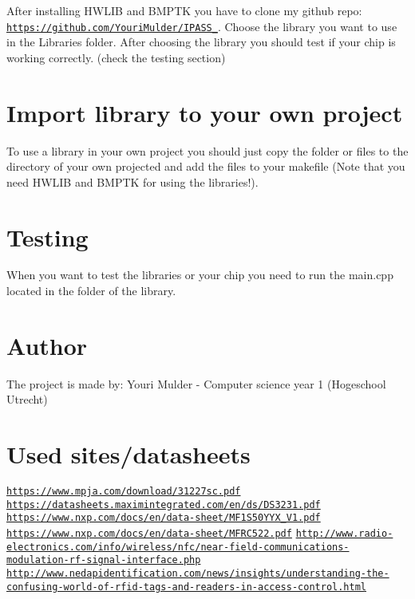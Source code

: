 After installing H\+W\+L\+IB and B\+M\+P\+TK you have to clone my github repo\+: \href{https://github.com/YouriMulder/IPASS_2018}{\tt https\+://github.\+com/\+Youri\+Mulder/\+I\+P\+A\+S\+S\+\_}. Choose the library you want to use in the Libraries folder. After choosing the library you should test if your chip is working correctly. (check the testing section)\hypertarget{index_import_sec}{}\section{Import library to your own project}\label{index_import_sec}
To use a library in your own project you should just copy the folder or files to the directory of your own projected and add the files to your makefile (Note that you need H\+W\+L\+IB and B\+M\+P\+TK for using the libraries!).\hypertarget{index_test_sec}{}\section{Testing}\label{index_test_sec}
When you want to test the libraries or your chip you need to run the main.\+cpp located in the folder of the library.\hypertarget{index_author_sec}{}\section{Author}\label{index_author_sec}
The project is made by\+: Youri Mulder -\/ Computer science year 1 (Hogeschool Utrecht)\hypertarget{index_reeferences_sec}{}\section{Used sites/datasheets}\label{index_reeferences_sec}
\href{https://www.mpja.com/download/31227sc.pdf}{\tt https\+://www.\+mpja.\+com/download/31227sc.\+pdf} \href{https://datasheets.maximintegrated.com/en/ds/DS3231.pdf}{\tt https\+://datasheets.\+maximintegrated.\+com/en/ds/\+D\+S3231.\+pdf} \href{https://www.nxp.com/docs/en/data-sheet/MF1S50YYX_V1.pdf}{\tt https\+://www.\+nxp.\+com/docs/en/data-\/sheet/\+M\+F1\+S50\+Y\+Y\+X\+\_\+\+V1.\+pdf} \href{https://www.nxp.com/docs/en/data-sheet/MFRC522.pdf}{\tt https\+://www.\+nxp.\+com/docs/en/data-\/sheet/\+M\+F\+R\+C522.\+pdf} \href{http://www.radio-electronics.com/info/wireless/nfc/near-field-communications-modulation-rf-signal-interface.php}{\tt http\+://www.\+radio-\/electronics.\+com/info/wireless/nfc/near-\/field-\/communications-\/modulation-\/rf-\/signal-\/interface.\+php} \href{http://www.nedapidentification.com/news/insights/understanding-the-confusing-world-of-rfid-tags-and-readers-in-access-control.html}{\tt http\+://www.\+nedapidentification.\+com/news/insights/understanding-\/the-\/confusing-\/world-\/of-\/rfid-\/tags-\/and-\/readers-\/in-\/access-\/control.\+html} 